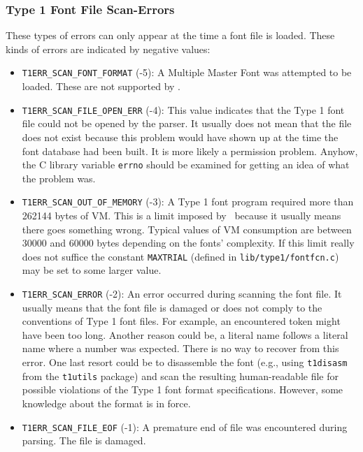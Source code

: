 \subsubsection{Type 1 Font File Scan-Errors}
These types of errors can only appear at the time a font file is loaded.
These kinds of errors are indicated by negative values:
\begin{itemize}
\item \verb+T1ERR_SCAN_FONT_FORMAT+ (-5): A Multiple Master Font was attempted
  to be loaded. These are not supported by \tonelib.
\item \verb+T1ERR_SCAN_FILE_OPEN_ERR+ (-4): This value indicates that the Type
  1 font file could not be opened by the parser. It usually does not mean that
  the file does not exist because this problem would have shown up at the time
  the font database had been built. It is more likely a permission problem.
  Anyhow, the C library variable \verb+errno+ should be examined for getting
  an idea of what the problem was.
\item \verb+T1ERR_SCAN_OUT_OF_MEMORY+ (-3): A Type 1 font program required
  more than 262144 bytes of VM. This is a limit imposed by \tonelib\ because
  it usually means there goes something wrong. Typical values of VM
  consumption are between 30000 and 60000 bytes depending on the fonts'
  complexity. If this limit really does not suffice the constant
  \verb+MAXTRIAL+ (defined in \verb+lib/type1/fontfcn.c+) may be set to some
  larger value. 
\item \verb+T1ERR_SCAN_ERROR+ (-2): An error occurred during scanning the font
  file. It usually means that the font file is damaged or does not comply to
  the conventions of Type 1 font files. For example, an encountered token might
  have been too long. Another reason could be, a literal name follows a literal
  name where a number was expected. There is no way to recover from this
  error. One last resort could be to disassemble the font (e.g., using
  \verb+t1disasm+ from the \verb+t1utils+ package) and scan the resulting
  human-readable file for possible violations of the Type 1 font format
  specifications. However, some knowledge about the format is in force.
\item \verb+T1ERR_SCAN_FILE_EOF+ (-1): A premature end of file was encountered
  during parsing. The file is damaged.
\end{itemize}

